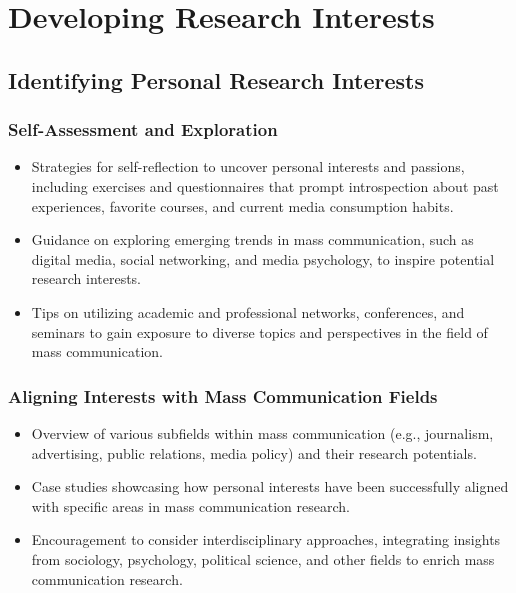 \documentclass[
]{book}
\begin{document}
\hypertarget{developing-research-interests}{%
\chapter*{Developing Research Interests}\label{developing-research-interests}}

\hypertarget{identifying-personal-research-interests}{%
\section*{Identifying Personal Research Interests}\label{identifying-personal-research-interests}}

\hypertarget{self-assessment-and-exploration}{%
\subsection*{Self-Assessment and Exploration}\label{self-assessment-and-exploration}}

\begin{itemize}
\item
  Strategies for self-reflection to uncover personal interests and passions, including exercises and questionnaires that prompt introspection about past experiences, favorite courses, and current media consumption habits.
\item
  Guidance on exploring emerging trends in mass communication, such as digital media, social networking, and media psychology, to inspire potential research interests.
\item
  Tips on utilizing academic and professional networks, conferences, and seminars to gain exposure to diverse topics and perspectives in the field of mass communication.
\end{itemize}

\hypertarget{aligning-interests-with-mass-communication-fields}{%
\subsection*{Aligning Interests with Mass Communication Fields}\label{aligning-interests-with-mass-communication-fields}}

\begin{itemize}
\item
  Overview of various subfields within mass communication (e.g., journalism, advertising, public relations, media policy) and their research potentials.
\item
  Case studies showcasing how personal interests have been successfully aligned with specific areas in mass communication research.
\item
  Encouragement to consider interdisciplinary approaches, integrating insights from sociology, psychology, political science, and other fields to enrich mass communication research.
\end{itemize}
\end{document}

